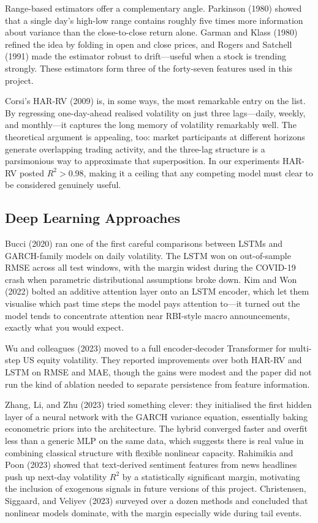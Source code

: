 Range-based estimators offer a complementary angle. Parkinson (1980) showed that a single day's high-low range contains roughly five times more information about variance than the close-to-close return alone. Garman and Klass (1980) refined the idea by folding in open and close prices, and Rogers and Satchell (1991) made the estimator robust to drift---useful when a stock is trending strongly. These estimators form three of the forty-seven features used in this project.

Corsi's HAR-RV (2009) is, in some ways, the most remarkable entry on the list. By regressing one-day-ahead realised volatility on just three lags---daily, weekly, and monthly---it captures the long memory of volatility remarkably well. The theoretical argument is appealing, too: market participants at different horizons generate overlapping trading activity, and the three-lag structure is a parsimonious way to approximate that superposition. In our experiments HAR-RV posted $R^2 > 0.98$, making it a ceiling that any competing model must clear to be considered genuinely useful.

\subsection{Deep Learning Approaches}

Bucci (2020) ran one of the first careful comparisons between LSTMs and GARCH-family models on daily volatility. The LSTM won on out-of-sample RMSE across all test windows, with the margin widest during the COVID-19 crash when parametric distributional assumptions broke down. Kim and Won (2022) bolted an additive attention layer onto an LSTM encoder, which let them visualise which past time steps the model pays attention to---it turned out the model tends to concentrate attention near RBI-style macro announcements, exactly what you would expect.

Wu and colleagues (2023) moved to a full encoder-decoder Transformer for multi-step US equity volatility. They reported improvements over both HAR-RV and LSTM on RMSE and MAE, though the gains were modest and the paper did not run the kind of ablation needed to separate persistence from feature information.

Zhang, Li, and Zhu (2023) tried something clever: they initialised the first hidden layer of a neural network with the GARCH variance equation, essentially baking econometric priors into the architecture. The hybrid converged faster and overfit less than a generic MLP on the same data, which suggests there is real value in combining classical structure with flexible nonlinear capacity. Rahimikia and Poon (2023) showed that text-derived sentiment features from news headlines push up next-day volatility $R^2$ by a statistically significant margin, motivating the inclusion of exogenous signals in future versions of this project. Christensen, Siggaard, and Veliyev (2023) surveyed over a dozen methods and concluded that nonlinear models dominate, with the margin especially wide during tail events.

